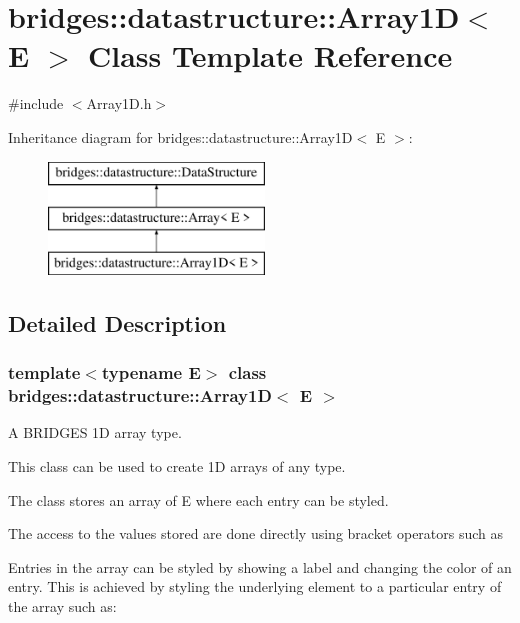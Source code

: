 \hypertarget{classbridges_1_1datastructure_1_1_array1_d}{}\section{bridges\+::datastructure\+::Array1D$<$ E $>$ Class Template Reference}
\label{classbridges_1_1datastructure_1_1_array1_d}


{\ttfamily \#include $<$Array1\+D.\+h$>$}

Inheritance diagram for bridges\+::datastructure\+::Array1D$<$ E $>$\+:\begin{figure}[H]
\begin{center}
\leavevmode
\includegraphics[height=3.000000cm]{classbridges_1_1datastructure_1_1_array1_d}
\end{center}
\end{figure}


\subsection{Detailed Description}
\subsubsection*{template$<$typename E$>$\newline
class bridges\+::datastructure\+::\+Array1\+D$<$ E $>$}

A B\+R\+I\+D\+G\+ES 1D array type. 

This class can be used to create 1D arrays of any type.

The class stores an array of E where each entry can be styled.

The access to the values stored are done directly using bracket operators such as


\begin{DoxyCode}{0}
\end{DoxyCode}


Entries in the array can be styled by showing a label and changing the color of an entry. This is achieved by styling the underlying element to a particular entry of the array such as\+:



